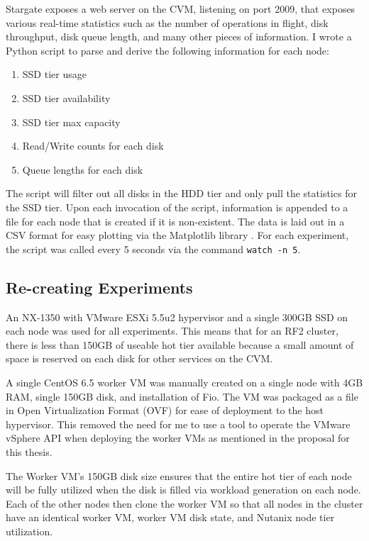\documentclass[12pt]{article}
\begin{document}
  Stargate exposes a web server on the CVM, listening on port 2009, that
  exposes various real-time statistics such as the number of operations in flight,
  disk throughput, disk queue length, and many other pieces of information. I
  wrote a Python script to parse and derive the following information for each
  node:

  \begin{tcolorbox}
  \begin{enumerate}
    \item SSD tier usage
    \item SSD tier availability
    \item SSD tier max capacity
    \item Read/Write counts for each disk
    \item Queue lengths for each disk
  \end{enumerate}
  \end{tcolorbox}

  The script will filter out all disks in the HDD tier and only pull the
  statistics for the SSD tier. Upon each invocation of the script, information
  is appended to a file for each node that is created if it is non-existent.
  The data is laid out in a CSV format for easy plotting via the Matplotlib
  library \cite{matplotlib}. For each experiment, the script was called every 5
  seconds via the command \texttt{watch -n 5}.

  \subsection{Re-creating Experiments}

  An NX-1350 with VMware ESXi 5.5u2 hypervisor and a single 300GB SSD on each
  node was used for all experiments. This means that for an RF2
  cluster, there is less than 150GB of useable hot tier available because a small
  amount of space is reserved on each disk for other services on the CVM.

  A single CentOS 6.5 worker VM was manually created on a single node with 4GB
  RAM, single 150GB disk, and installation of Fio. The VM was packaged as a
  file in Open Virtualization Format (OVF) for ease of deployment to the host
  hypervisor. This removed the need for me to use a tool to operate the VMware
  vSphere API when deploying the worker VMs as mentioned in the proposal for
  this thesis.

  The Worker VM's 150GB disk size ensures that the entire hot tier of each node
  will be fully utilized when the disk is filled via workload generation on
  each node. Each of the other nodes then clone the worker VM so that all nodes
  in the cluster have an identical worker VM, worker VM disk state, and Nutanix
  node tier utilization.
\end{document}
